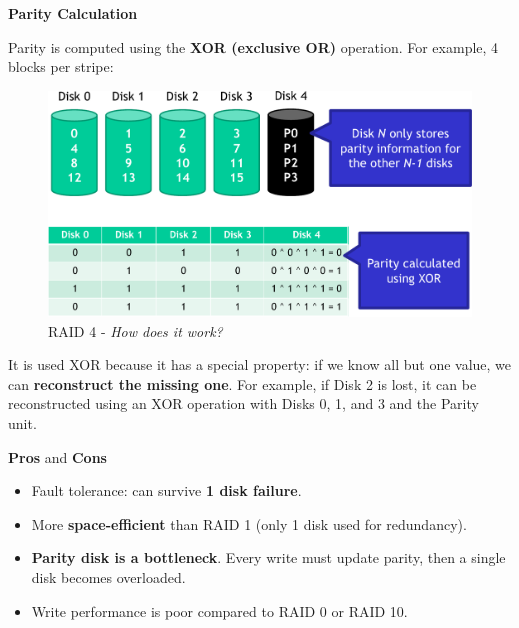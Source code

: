 \highspace
\begin{flushleft}
    \textcolor{Green3}{ \textbf{Parity Calculation}}
\end{flushleft}
Parity is computed using the \textbf{XOR (exclusive OR)} operation. For example, 4 blocks per stripe:
\begin{figure}[!htp]
    \centering
    \includegraphics[width=\textwidth]{img/raid-6.pdf}
    \caption{RAID 4 - \emph{How does it work?}}
\end{figure}

\noindent
It is used XOR because it has a special property: if we know all but one value, we can \textbf{reconstruct the missing one}. For example, if Disk 2 is lost, it can be reconstructed using an XOR operation with Disks 0, 1, and 3 and the Parity unit.

\highspace
\begin{flushleft}
    \textcolor{Green3}{ \textbf{Pros}} and \textcolor{Red2}{ \textbf{Cons}}
\end{flushleft}
\begin{itemize}
    \item[\textcolor{Green3}{\faIcon{check-circle}}] Fault tolerance: can survive \textbf{1 disk failure}.
    \item[\textcolor{Green3}{\faIcon{check-circle}}] More \textbf{space-efficient} than RAID 1 (only 1 disk used for redundancy).
    \item[\textcolor{Red2}{\faIcon{times-circle}}] \textbf{Parity disk is a bottleneck}. Every write must update parity, then a single disk becomes overloaded.
    \item[\textcolor{Red2}{\faIcon{times-circle}}] Write performance is poor compared to RAID 0 or RAID 10.
\end{itemize}

